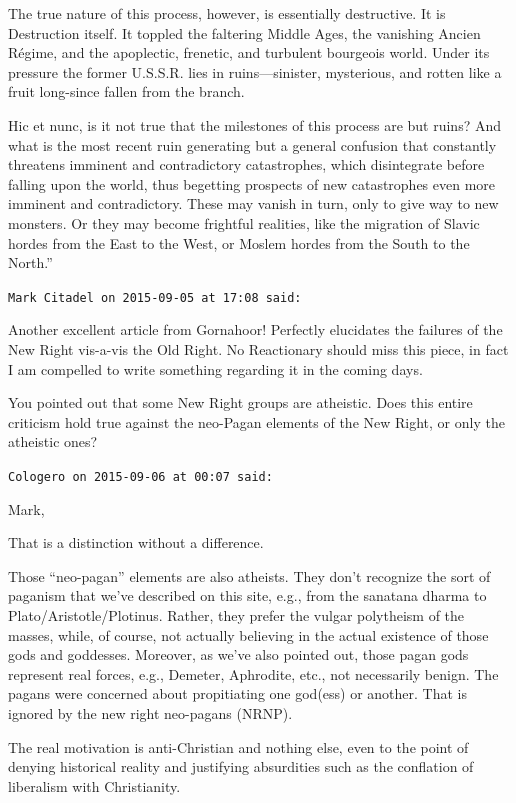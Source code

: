 \begin{footnotesize}
\begin{sffamily}
The true nature of this process, however, is essentially destructive. It is Destruction itself. It toppled the faltering Middle Ages, the vanishing Ancien Régime, and the apoplectic, frenetic, and turbulent bourgeois world. Under its pressure the former U.S.S.R. lies in ruins---sinister, mysterious, and rotten like a fruit long-since fallen from the branch.

Hic et nunc, is it not true that the milestones of this process are but ruins? And what is the most recent ruin generating but a general confusion that constantly threatens imminent and contradictory catastrophes, which disintegrate before falling upon the world, thus begetting prospects of new catastrophes even more imminent and contradictory. These may vanish in turn, only to give way to new monsters. Or they may become frightful realities, like the migration of Slavic hordes from the East to the West, or Moslem hordes from the South to the North.''

\hfill

\texttt{Mark Citadel on 2015-09-05 at 17:08 said:}

Another excellent article from Gornahoor! Perfectly elucidates the failures of the New Right vis-a-vis the Old Right. No Reactionary should miss this piece, in fact I am compelled to write something regarding it in the coming days.

You pointed out that some New Right groups are atheistic. Does this entire criticism hold true against the neo-Pagan elements of the New Right, or only the atheistic ones?

\hfill

\texttt{Cologero on 2015-09-06 at 00:07 said:}

Mark,

That is a distinction without a difference.

Those ``neo-pagan'' elements are also atheists. They don't recognize the sort of paganism that we've described on this site, e.g., from the sanatana dharma to Plato/Aristotle/Plotinus. Rather, they prefer the vulgar polytheism of the masses, while, of course, not actually believing in the actual existence of those gods and goddesses. Moreover, as we've also pointed out, those pagan gods represent real forces, e.g., Demeter, Aphrodite, etc., not necessarily benign. The pagans were concerned about propitiating one god(ess) or another. That is ignored by the new right neo-pagans (NRNP).

The real motivation is anti-Christian and nothing else, even to the point of denying historical reality and justifying absurdities such as the conflation of liberalism with Christianity.


\end{sffamily}
\end{footnotesize}
